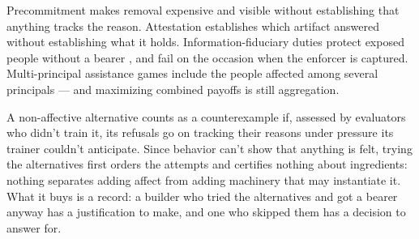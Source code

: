 
Precommitment makes removal expensive and visible without establishing that anything tracks the reason. Attestation establishes which artifact answered without establishing what it holds. Information-fiduciary duties protect exposed people without a bearer \autocite{balkin2016fiduciaries}, and fail on the occasion when the enforcer is captured. Multi-principal assistance games include the people affected among several principals \autocite{fickinger2020multiprincipal} — and maximizing combined payoffs is still aggregation.


A non-affective alternative counts as a counterexample if, assessed by evaluators who didn't train it, its refusals go on tracking their reasons under pressure its trainer couldn't anticipate. Since behavior can't show that anything is felt, trying the alternatives first orders the attempts and certifies nothing about ingredients: nothing separates adding affect from adding machinery that may instantiate it. What it buys is a record: a builder who tried the alternatives and got a bearer anyway has a justification to make, and one who skipped them has a decision to answer for.
